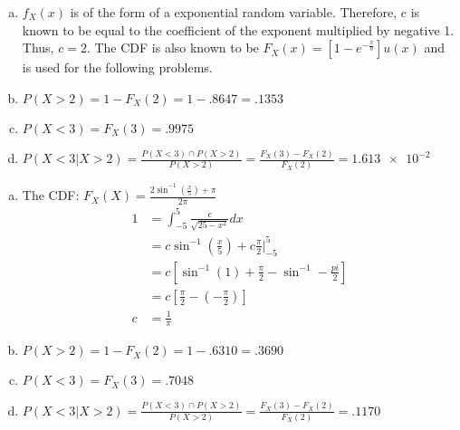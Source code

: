 \documentclass[12pt]{article}
\newenvironment{problem}[2][Problem]{\begin{trivlist}
\item[\hskip \labelsep {\bfseries #1}\hskip \labelsep {\bfseries #2.}]
  \vspace{1 cm}
}{\end{trivlist}}
\begin{document}
\begin{problem}{3.13}
\item
  \begin{enumerate}[a.]
    \item %
      $f_X(x)$ is of the form of a exponential random variable. Therefore,
      c is known to be equal to the coefficient of the exponent multiplied
      by negative 1. Thus, $c = 2$. The CDF is also known to be 
      $F_X(x) = \left[1 - e^{-\frac{x}{b}}\right]u(x)$ and is used for the 
      following problems. 
    \item %
      $P(X>2) = 1 - F_X(2) = 1 - .8647 = .1353$
    \item %
      $P(X<3) = F_X(3) = .9975$
    \item %
      $P(X < 3|X>2) = \frac{P(X<3)\cap P(X>2)}{P(X>2)}
      = \frac{F_X(3) - F_X(2)}{F_X(2)} = \num{1.613e-2}$
  \end{enumerate}
\end{problem}

\begin{problem}{3.15}
\item
  \begin{enumerate}[a.]
    \item %
      The CDF: $F_X(X) = \frac{2\sin^{-1}(\frac{x}{5})+\pi}{2\pi}$
      \begin{align*}
        1 &= \int_{-5}^5 \frac{c}{\sqrt{25-x^2}}dx \\
        &= c\sin^{-1}\left( \frac{x}{5} \right) + c\frac{\pi}{2}\big|_{-5}^5 \\
        &= c\left[ \sin^{-1}(1) + \frac{\pi}{2} - \sin^{-1} - \frac{pi}{2} \right] \\
        &= c\left[ \frac{\pi}{2} - (-\frac{\pi}{2})\right] \\
        c &= \frac{1}{\pi}
      \end{align*}
    \item %
      $P(X>2) = 1 - F_X(2) = 1 - .6310 = .3690$
    \item %
      $P(X<3) = F_X(3) = .7048$
    \item %
      $P(X < 3|X>2) = \frac{P(X<3)\cap P(X>2)}{P(X>2)}
      = \frac{F_X(3) - F_X(2)}{F_X(2)} = .1170$
  \end{enumerate}
\end{problem}
\end{document}
